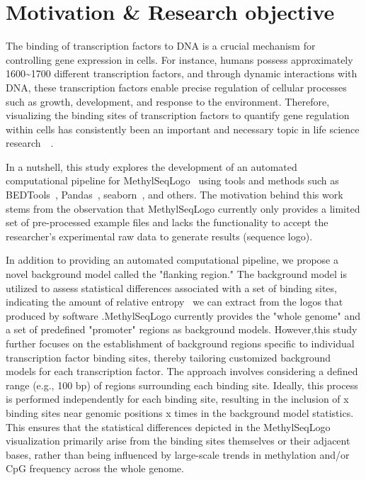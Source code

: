\documentclass{PHlab-thesis}
\begin{document}
\section{Motivation \& Research objective}
The binding of transcription factors to DNA is a crucial mechanism for controlling gene expression in cells. For instance, humans possess approximately 1600\textasciitilde1700 different transcription factors, and through dynamic interactions with DNA, these transcription factors enable precise regulation of cellular processes such as growth, development, and response to the environment. Therefore, visualizing the binding sites of transcription factors to quantify gene regulation within cells has consistently been an important and necessary topic in life science research~\cite{vaquerizas2009census}~\cite{liu2017transcriptional}.

In a nutshell, this study explores the development of an automated computational pipeline for MethylSeqLogo~\cite{Hsu2022.11.05.515271} using tools and methods such as BEDTools~\cite{10.1093/bioinformatics/btq033}, Pandas~\cite{mckinney2010data}, seaborn~\cite{Waskom2021}, and others. The motivation behind this work stems from the observation that MethylSeqLogo currently only provides a limited set of pre-processed example files and lacks the functionality to accept the researcher's experimental raw data to generate results (sequence logo).

In addition to providing an automated computational pipeline, we propose a novel background model called the "flanking region." The background model is utilized to assess statistical differences associated with a set of binding sites, indicating the amount of relative entropy~\cite{kullback1951information} we can extract from the logos that produced by software .MethylSeqLogo currently provides the "whole genome" and a set of predefined "promoter" regions as background models. However,this study further focuses on the establishment of background regions specific to individual transcription factor binding sites, thereby tailoring customized background models for each transcription factor. The approach involves considering a defined range (e.g., 100 bp) of regions surrounding each binding site. Ideally, this process is performed independently for each binding site, resulting in the inclusion of x binding sites near genomic positions x times in the background model statistics. This ensures that the statistical differences depicted in the MethylSeqLogo visualization primarily arise from the binding sites themselves or their adjacent bases, rather than being influenced by large-scale trends in methylation and/or CpG frequency across the whole genome.
\end{document}
